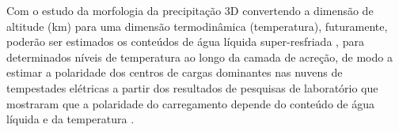 Com o estudo da morfologia da precipitação 3D convertendo a dimensão de altitude (km) para uma dimensão termodinâmica (temperatura), futuramente, poderão ser estimados os conteúdos de água líquida super-resfriada \cite{sekhon1971, hagen2003}, para determinados níveis de temperatura ao longo da camada de acreção, de modo a estimar a polaridade dos centros de cargas dominantes nas nuvens de tempestades elétricas a partir dos resultados de pesquisas de laboratório que mostraram que a polaridade do carregamento depende do conteúdo de água líquida e da temperatura \cite{Takahashi1978,Saunders1999,saunders2008}.


